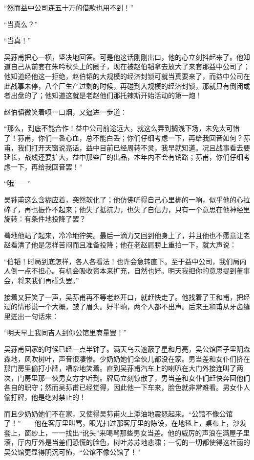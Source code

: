 \par “然而益中公司连五十万的借款也用不到！”
\par “当真么？”
\par “当真！”
\par 吴荪甫把心一横，坚决地回答。可是他这话刚刚出口，他的心立刻抖起来了。他知道自己从前套在朱吟秋头上的圈子，现在被赵伯韬拿去放大了来套那益中公司了；他知道经他这一拒绝，赵伯韬的大规模的经济封锁可就当真要来了，而益中公司在此战事未停，八个厂生产过剩的时候，再碰到大规模的经济封锁，那就只有倒闭或者出盘的了；他知道这就是老赵他们那托辣斯开始活动的第一炮！
\par 赵伯韬微笑着喷一口烟，又逼进一步道：
\par “那么，到底不能合作！益中公司前途远大，就这么弄到搁浅下场，未免太可惜了！荪甫，你们一番心血，总不能白丢；你们仔细考虑一下，再给我回音如何？荪甫，我们打开天窗说亮话，益中目前已经周转不灵，我早就知道。况且战事看去要延长，战线还要扩大，益中那些厂的出品，本年内不会有销路；荪甫，你们仔细考虑一下，再给我回音罢！”
\par “哦——”
\par 吴荪甫这么含糊应着，突然软化了；他仿佛听得自己心里梆的一响，似乎他的心拉碎了，再也振作不起来；他失了抵抗力，也失了自信力，只有一个意思在他神经里旋转：有条件地投降了罢？
\par 蓦地他站了起来，冷冷地狞笑。最后一滴力又回到他身上了，并且他也不愿意让老赵看清了他是怎样苦闷而且准备投降；他在老赵肩膀上重拍一下，就大声说：
\par “伯韬！时局到底怎样，各人各看法！也许会急转直下。至于益中公司，我们局内人倒一点不担心。有机会吸收资本来扩充，自然也好。明天我把你的意思提到董事会，将来我们再碰头罢。”
\par 接着又狂笑了一声，吴荪甫再不等老赵开口，就赶快走了。他找着了王和甫，把经过的情形说一个大概，皱了眉头。好半晌，两个人都不出声。后来王和甫从牙齿缝里迸出一句话来：
\par “明天早上我同吉人到你公馆里商量罢！”
\par 吴荪甫回家的时候已经一点半钟了。满天乌云遮蔽了星和月亮，吴公馆园子里阴森森地，风吹树叶，声音很凄惨。少奶奶她们全伙儿都没在家。男当差和女仆们挤在那门房里偷打小牌，嘈杂地笑着。直到吴荪甫汽车上的喇叭在大门外接连叫了两次，门房里那一伙男女方才听到。牌局立刻惊散了，男当差和女仆们赶快奔回他们各自的职守；然而吴荪甫已经觉得，因此他一下车来，脸色就非常难看。男女仆人偷打牌，他是绝对禁止的！
\par 而且少奶奶她们不在家，又使得吴荪甫火上添油地震怒起来。“公馆不像公馆了！”——他在客厅里叫骂，眼光扫过那客厅里的陈设，在地毯上，桌布上，沙发套上，窗纱上，一一找出“讹头”来喝骂那些男女当差。他的威厉的声浪在满屋子里滚，厅内厅外是当差们恐慌的脸色，树叶苏苏地悲啸；一切的一切都使得这壮丽的吴公馆更显得阴沉可怖，“公馆不像公馆了！”
